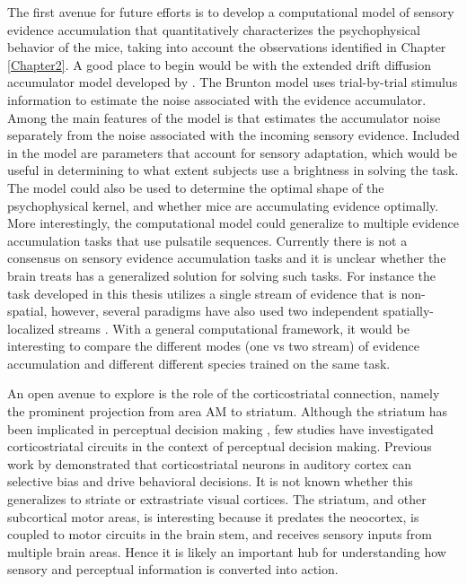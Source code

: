 The first avenue for future efforts is to develop a computational model of sensory evidence accumulation that quantitatively characterizes the psychophysical behavior of the mice, taking into account the observations identified in Chapter \ref{Chapter2}. A good place to begin would be with the extended drift diffusion accumulator model developed by \parencite{Brunton2013}. The Brunton model uses trial-by-trial stimulus information to estimate the noise associated with the evidence accumulator. Among the main features of the model is that estimates the accumulator noise separately from the noise associated with the incoming sensory evidence. Included in the model are parameters that account for sensory adaptation, which would be useful in determining to what extent subjects use a brightness in solving the task. The model could also be used to determine the optimal shape of the psychophysical kernel, and whether mice are accumulating evidence optimally. More interestingly, the computational model could generalize to multiple evidence accumulation tasks that use pulsatile sequences. Currently there is not a consensus on sensory evidence accumulation tasks and it is unclear whether the brain treats has a generalized solution for solving such tasks. For instance the task developed in this thesis utilizes a single stream of evidence that is non-spatial, however, several paradigms have also used two independent spatially-localized streams  \parencite{Sanders2012,Brunton2013,Marcos2016,Katz2016}. With a general computational framework, it would be interesting to compare the different modes (one vs two stream) of evidence accumulation and different different species trained on the same task. \par 

An open avenue to explore is the role of the corticostriatal connection, namely the prominent projection from area AM to striatum. Although the striatum has been implicated in perceptual decision making \parencite{Ding2010,Ding2013}, few studies have investigated corticostriatal circuits in the context of perceptual decision making. Previous work by \textcite{Znamenskiy2013b} demonstrated that corticostriatal neurons in auditory cortex can selective bias and drive behavioral decisions. It is not known whether this generalizes to striate or extrastriate visual cortices. The striatum, and other subcortical motor areas, is interesting because it predates the neocortex, is coupled to motor circuits in the brain stem, and receives sensory inputs from multiple brain areas. Hence it is likely an important hub for understanding how sensory and perceptual information is converted into action. \par

